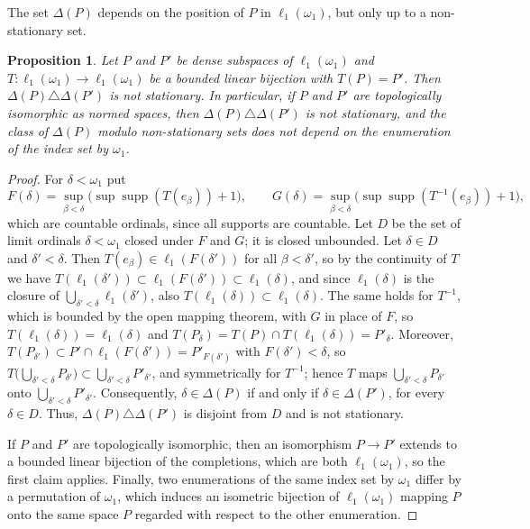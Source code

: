 \documentclass[12pt]{article}
\newtheorem{proposition}[theorem]{Proposition}
\newcommand{\ellone}[1]{\ell_1(#1)}
\newcommand{\supp}{\operatorname{supp}}
\begin{document}
The set $\Delta(P)$ depends on the position of $P$ in $\ellone{\omega_1}$,
but only up to a non-stationary set.

\begin{proposition}\label{InvarianceOfDelta} Let $P$ and $P'$ be dense
    subspaces of $\ellone{\omega_1}$ and $T:\ellone{\omega_1}\to\ellone{\omega_1}$
    be a bounded linear bijection with $T(P)=P'$. Then
    $\Delta(P)\triangle\Delta(P')$ is not stationary. In particular, if $P$
    and $P'$ are topologically isomorphic as normed spaces, then
    $\Delta(P)\triangle\Delta(P')$ is not stationary, and the class of
    $\Delta(P)$ modulo non-stationary sets does not depend on the enumeration
    of the index set by $\omega_1$.
\end{proposition}
\begin{proof} For $\delta<\omega_1$ put
    \[
    F(\delta)=\sup_{\beta<\delta}\bigl(\sup\supp(T(e_\beta))+1\bigr),\qquad
    G(\delta)=\sup_{\beta<\delta}\bigl(\sup\supp(T^{-1}(e_\beta))+1\bigr),
    \]
    which are countable ordinals, since all supports are countable. Let $D$
    be the set of limit ordinals $\delta<\omega_1$ closed under $F$ and $G$;
    it is closed unbounded. Let $\delta\in D$ and $\delta'<\delta$. Then
    $T(e_\beta)\in\ellone{F(\delta')}$ for all $\beta<\delta'$, so by the
    continuity of $T$ we have $T(\ellone{\delta'})\subset\ellone{F(\delta')}
    \subset\ellone{\delta}$, and since $\ellone{\delta}$ is the closure of
    $\bigcup_{\delta'<\delta}\ellone{\delta'}$, also
    $T(\ellone{\delta})\subset\ellone{\delta}$. The same holds for $T^{-1}$, which is bounded by the open mapping theorem,
    with $G$ in place of $F$, so $T(\ellone{\delta})=\ellone{\delta}$ and
    $T(P_\delta)=T(P)\cap T(\ellone{\delta})=P'_\delta$. Moreover,
    $T(P_{\delta'})\subset P'\cap\ellone{F(\delta')}=P'_{F(\delta')}$ with
    $F(\delta')<\delta$, so
    $T\bigl(\bigcup_{\delta'<\delta}P_{\delta'}\bigr)\subset
    \bigcup_{\delta'<\delta}P'_{\delta'}$, and symmetrically for $T^{-1}$;
    hence $T$ maps $\bigcup_{\delta'<\delta}P_{\delta'}$ onto
    $\bigcup_{\delta'<\delta}P'_{\delta'}$. Consequently, $\delta\in\Delta(P)$
    if and only if $\delta\in\Delta(P')$, for every $\delta\in D$. Thus,
    $\Delta(P)\triangle\Delta(P')$ is disjoint from $D$ and is not
    stationary.

    If $P$ and $P'$ are topologically isomorphic, then an isomorphism
    $P\to P'$ extends to a bounded linear bijection of the completions, which
    are both $\ellone{\omega_1}$, so the first claim applies. Finally, two
    enumerations of the same index set by $\omega_1$ differ by a permutation
    of $\omega_1$, which induces an isometric bijection of
    $\ellone{\omega_1}$ mapping $P$ onto the same space $P$ regarded with
    respect to the other enumeration.
\end{proof}
\end{document}

